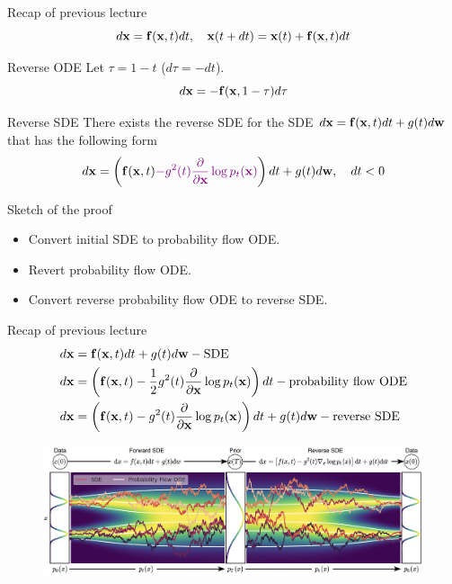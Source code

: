 \begin{frame}{Recap of previous lecture}
	\vspace{-0.3cm}
	\[
		d\mathbf{x} = \mathbf{f}(\mathbf{x}, t) dt, \quad \mathbf{x}(t + dt) = \mathbf{x}(t) + \mathbf{f}(\mathbf{x}, t) dt
	\]
	\vspace{-0.5cm}
	\begin{block}{Reverse ODE}
		Let $\tau = 1 - t$ ($d\tau = -dt$).
		\vspace{-0.3cm}
		\[
			d\mathbf{x} = - \mathbf{f}(\mathbf{x}, 1 - \tau) d \tau
		\]
	\end{block}
	\vspace{-0.5cm}
	\begin{block}{Reverse SDE}
		There exists the reverse SDE for the SDE $d\mathbf{x} = \mathbf{f}(\mathbf{x}, t) dt + g(t) d \mathbf{w}$ that has the following form
		\vspace{-0.3cm}
		\[
			d\mathbf{x} = \left(\mathbf{f}(\mathbf{x}, t) {\color{violet}- g^2(t) \frac{\partial}{\partial \mathbf{x}}\log p_t(\mathbf{x})}\right) dt + g(t) d \mathbf{w}, \quad dt < 0
		\] 
	\end{block}
	\vspace{-0.5cm}
	\begin{block}{Sketch of the proof}
		\begin{itemize}
			\item Convert initial SDE to probability flow ODE.
			\item Revert probability flow ODE.
			\item Convert reverse probability flow ODE to reverse SDE.
		\end{itemize}
	\end{block}
\end{frame}
\begin{frame}{Recap of previous lecture}
	\vspace{-0.5cm}
	\begin{align*}
		d\mathbf{x} &= \mathbf{f}(\mathbf{x}, t) dt + g(t) d \mathbf{w} - \text{SDE} \\
		d\mathbf{x} &= \left(\mathbf{f}(\mathbf{x}, t) -\frac{1}{2} g^2(t) \frac{\partial}{\partial \mathbf{x}} \log p_t(\mathbf{x}) \right) dt - \text{probability flow ODE} \\
		d\mathbf{x} &= \left(\mathbf{f}(\mathbf{x}, t) - g^2(t) \frac{\partial }{\partial \mathbf{x}}\log p_t(\mathbf{x})\right) dt + g(t) d \mathbf{w} - \text{reverse SDE}
	\end{align*}
	\vspace{-0.5cm}
	\begin{figure}
		\includegraphics[width=\linewidth]{figs/sde}
	\end{figure}
\end{frame}
